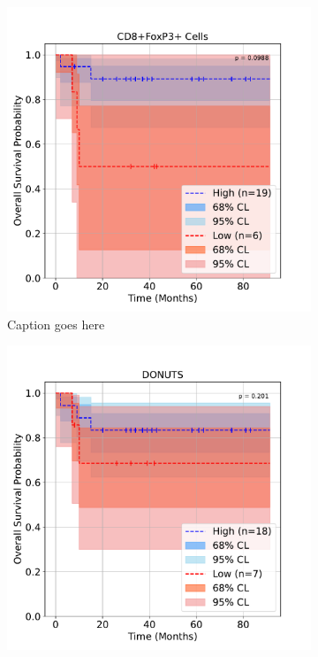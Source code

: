 \documentclass[article]{jss}
\begin{document}
\begin{figure}
  \centering
  \begin{subfigure}[t]{0.49\textwidth}
    \centering
    \includegraphics{lung_cells_km_OS.pdf}
    \caption{\label{fig:lung-dataset-cells} Caption goes here}
  \end{subfigure}
  \begin{subfigure}[t]{0.49\textwidth}
    \centering
    \includegraphics{lung_donuts_km_OS.pdf}

\end{subfigure}
\end{figure}
\end{document}
